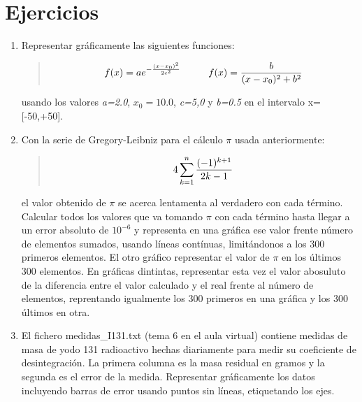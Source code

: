 \documentclass[letterpaper,10pt,spanish]{sphinxmanual}
\begin{document}
\section{Ejercicios}
\label{graficos:ejercicios}\begin{enumerate}
\item {} 
Representar gráficamente las siguientes funciones:
\begin{quote}
\begin{gather}
\begin{split}f(x) = a e^{- { \frac{(x-x_0)^2 }{ 2 c^2} } }  \hspace{1cm}  f(x) =  \frac{b}{(x - x_0)^2 + b^2 }\end{split}\notag
\end{gather}\end{quote}

usando los valores \emph{a=2.0}, $x_0=10.0$, \emph{c=5,0} y \emph{b=0.5} en el intervalo x={[}-50,+50{]}.

\item {} 
Con la serie de Gregory-Leibniz para el cálculo $\pi$ usada anteriormente:
\begin{quote}
\begin{gather}
\begin{split}4 \sum^n_{k=1} \frac{(-1)^{k+1}}{2k - 1}\end{split}\notag
\end{gather}\end{quote}

el valor obtenido de  $\pi$ se acerca lentamenta al verdadero con cada término. Calcular todos los  valores que va tomando  $\pi$ con cada término hasta llegar a un error absoluto de  $10^{-6}$ y representa en una gráfica ese valor frente número de elementos sumados, usando líneas contínuas, limitándonos a los 300 primeros elementos. El otro gráfico representar el valor de  $\pi$ en los últimos 300 elementos. En gráficas dintintas, representar esta vez el valor abosuluto de la diferencia entre el valor calculado y el real frente al número de elementos, reprentando igualmente los 300 primeros en una gráfica y los 300 últimos en otra.

\item {} 
El fichero medidas\_I131.txt (tema 6 en el aula virtual) contiene medidas de masa de yodo 131 radioactivo hechas diariamente para medir su coeficiente de desintegración. La primera columna es la masa residual en gramos y la segunda es el error de la medida. Representar gráficamente los datos incluyendo barras de error usando puntos sin líneas, etiquetando los ejes.


\end{enumerate}
\end{document}
